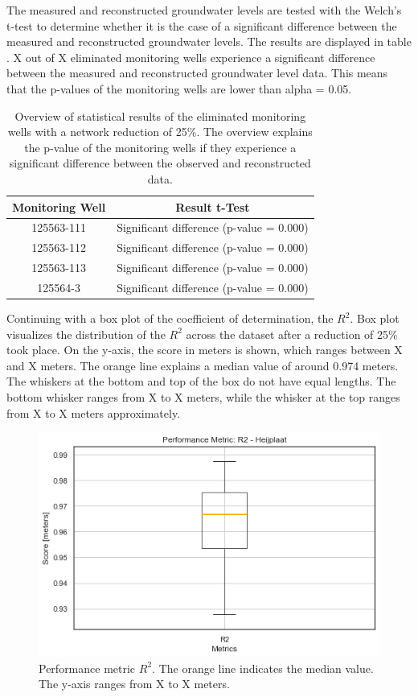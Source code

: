\newpage
The measured and reconstructed groundwater levels are tested with the Welch's t-test to determine whether it is the case of a significant difference between the measured and reconstructed groundwater levels. The results are displayed in table .  X out of X eliminated monitoring wells experience a significant difference between the measured and reconstructed groundwater level data. This means that the p-values of the monitoring wells are lower than alpha = 0.05.
\begin{table}
    \centering
        \caption{Overview of statistical results of the eliminated monitoring wells with a network reduction of 25\%. The overview explains the p-value of the monitoring wells if they experience a significant difference between the observed and reconstructed data. }
    \begin{tabular}{|c|c|} \hline 
         Monitoring Well& Result t-Test\\ \hline 
         125563-111& Significant difference (p-value = 0.000)\\ \hline 
         125563-112& Significant difference (p-value = 0.000)\\ \hline 
         125563-113& Significant difference (p-value = 0.000)\\ \hline 
         125564-3& Significant difference (p-value = 0.000)\\ \hline
    \end{tabular}
    \label{theij}
\end{table}
Continuing with a box plot of the coefficient of determination, the $R^2$. Box plot  visualizes the distribution of the $R^2$ across the dataset after a reduction of 25\% took place. On the y-axis, the score in meters is shown, which ranges between X and X meters. The orange line explains a median value of around 0.974 meters. The whiskers at the bottom and top of the box do not have equal lengths. The bottom whisker ranges from X to X meters, while the whisker at the top ranges from X to X meters approximately. 

\begin{figure}[htbp]
    \centering
    \includegraphics[width=0.70\linewidth]{frontmatter/Heijplaat-fig/R2.png}
    \caption{Performance metric $R^2$. The orange line indicates the median value. The y-axis ranges from X to X meters.}
    \label{boxheij}
\end{figure}

